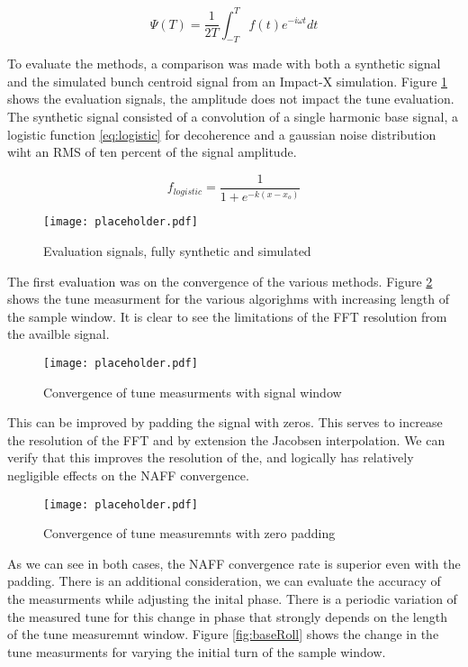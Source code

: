 \begin{equation}
	\Psi(T) = \frac{1}{2T}\int_{-T}^{T}f(t)e^{-i\omega t}dt
	\label{eq:naff}
\end{equation}

To evaluate the methods, a comparison was made with both a synthetic signal and the simulated bunch centroid signal from an Impact-X simulation. Figure \ref{fig:synTune} shows the evaluation signals, the amplitude does not impact the tune evaluation. The synthetic signal consisted of a convolution of a single harmonic base signal, a logistic function \ref{eq:logistic} for decoherence and a gaussian noise distribution wiht an RMS of ten percent of the signal amplitude. 

\begin{equation}
	f_{logistic} = \frac{1}{1 + e^{-k(x-x_o)}}
	\label{eq:logistic}
\end{equation}

\begin{figure}
	\centering
	\texttt{[image: placeholder.pdf]}
	\caption{Evaluation signals, fully synthetic and simulated}
	\label{fig:synTune}
\end{figure}

The first evaluation was on the convergence of the various methods. Figure \ref{fig:baseConv} shows the tune measurment for the various algorighms with increasing length of the sample window. It is clear to see the limitations of the FFT resolution from the availble signal. 

\begin{figure}
	\centering
	\texttt{[image: placeholder.pdf]}
	\caption{Convergence of tune measurments with signal window}
	\label{fig:baseConv}
\end{figure}

This can be improved by padding the signal with zeros. This serves to increase the resolution of the FFT and by extension the Jacobsen interpolation. We can verify that this improves the resolution of the, and logically has relatively negligible effects on the NAFF convergence.

\begin{figure}
	\centering
	\texttt{[image: placeholder.pdf]}
	\caption{Convergence of tune measuremnts with zero padding}
	\label{fig:padConv}
\end{figure}

As we can see in both cases, the NAFF convergence rate is superior even with the padding. There is an additional consideration, we can evaluate the accuracy of the measurments while adjusting the inital phase. There is a periodic variation of the measured tune for this change in phase that strongly depends on the length of the tune measuremnt window. Figure \ref{fig:baseRoll} shows the change in the tune measurments for varying the initial turn of the sample window. 

